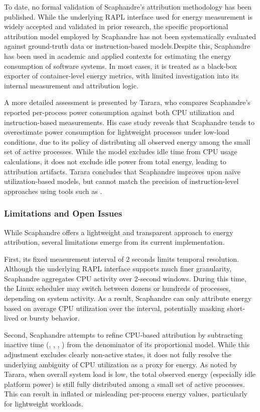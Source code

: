 To date, no formal validation of Scaphandre’s attribution methodology has been published. While the underlying RAPL interface used for energy measurement is widely accepted and validated in prior research, the specific proportional attribution model employed by Scaphandre has not been systematically evaluated against ground-truth data or instruction-based models.Despite this, Scaphandre has been used in academic and applied contexts for estimating the energy consumption of software systems. In most cases, it is treated as a black-box exporter of container-level energy metrics, with limited investigation into its internal measurement and attribution logic.

A more detailed assessment is presented by Tarara\parencite{Tarara2023CpuUtilization}, who compares Scaphandre’s reported per-process power consumption against both CPU utilization and instruction-based measurements. His case study reveals that Scaphandre tends to overestimate power consumption for lightweight processes under low-load conditions, due to its policy of distributing all observed energy among the small set of active processes. While the model excludes idle time from CPU usage calculations, it does not exclude idle power from total energy, leading to attribution artifacts. Tarara concludes that Scaphandre improves upon naïve utilization-based models, but cannot match the precision of instruction-level approaches using tools such as .

\subsubsection{Limitations and Open Issues}
\label{sec:scaphandre-limitations}

While Scaphandre offers a lightweight and transparent approach to energy attribution, several limitations emerge from its current implementation.

First, its fixed measurement interval of 2 seconds limits temporal resolution. Although the underlying RAPL interface supports much finer granularity, Scaphandre aggregates CPU activity over 2-second windows. During this time, the Linux scheduler may switch between dozens or hundreds of processes, depending on system activity. As a result, Scaphandre can only attribute energy based on average CPU utilization over the interval, potentially masking short-lived or bursty behavior.

Second, Scaphandre attempts to refine CPU-based attribution by subtracting inactive time (, , , ) from the denominator of its proportional model. While this adjustment excludes clearly non-active states, it does not fully resolve the underlying ambiguity of CPU utilization as a proxy for energy. As noted by Tarara\parencite{Tarara2023CpuUtilization}, when overall system load is low, the total observed energy (especially idle platform power) is still fully distributed among a small set of active processes. This can result in inflated or misleading per-process energy values, particularly for lightweight workloads.

